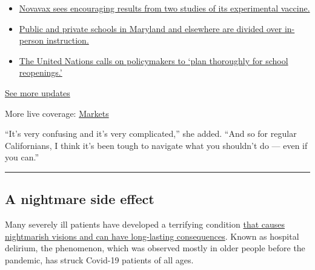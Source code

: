 \begin{itemize}
\tightlist
\item
  \href{https://www.nytimes.com/2020/08/04/world/coronavirus-cases.html?action=click\&pgtype=Article\&state=default\&region=MAIN_CONTENT_1\&context=storylines_live_updates\#link-1228a480}{Novavax
  sees encouraging results from two studies of its experimental
  vaccine.}
\item
  \href{https://www.nytimes.com/2020/08/04/world/coronavirus-cases.html?action=click\&pgtype=Article\&state=default\&region=MAIN_CONTENT_1\&context=storylines_live_updates\#link-4825b93}{Public
  and private schools in Maryland and elsewhere are divided over
  in-person instruction.}
\item
  \href{https://www.nytimes.com/2020/08/04/world/coronavirus-cases.html?action=click\&pgtype=Article\&state=default\&region=MAIN_CONTENT_1\&context=storylines_live_updates\#link-50f7386d}{The
  United Nations calls on policymakers to `plan thoroughly for school
  reopenings.'}
\end{itemize}

\href{https://www.nytimes.com/2020/08/04/world/coronavirus-cases.html?action=click\&pgtype=Article\&state=default\&region=MAIN_CONTENT_1\&context=storylines_live_updates}{See
more updates}

More live coverage:
\href{https://www.nytimes.com/live/2020/08/04/business/stock-market-today-coronavirus?action=click\&pgtype=Article\&state=default\&region=MAIN_CONTENT_1\&context=storylines_live_updates}{Markets}

``It's very confusing and it's very complicated,'' she added. ``And so
for regular Californians, I think it's been tough to navigate what you
shouldn't do --- even if you can.''

\begin{center}\rule{0.5\linewidth}{\linethickness}\end{center}

\hypertarget{a-nightmare-side-effect}{%
\subsection{A nightmare side effect}\label{a-nightmare-side-effect}}

Many severely ill patients have developed a terrifying condition
\href{https://www.nytimes.com/2020/06/28/health/coronavirus-delirium-hallucinations.html}{that
causes nightmarish visions and can have long-lasting consequences}.
Known as hospital delirium, the phenomenon, which was observed mostly in
older people before the pandemic, has struck Covid-19 patients of all
ages.

